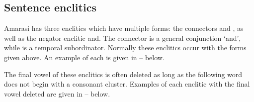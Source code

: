 \subsection{Sentence enclitics}\label{sec:SenEnc}
Amarasi has three enclitics which have multiple forms:
the connectors  and , as well as the negator enclitic  and.
The connector  is a general conjunction `and',
while  is a temporal subordinator.
Normally these enclitics occur with the forms given above.
An example of each is given in
-- below.

\begin{exe}
	\label{ex:130920-1, 0.51 ch:ph}
	\label{ex:130920-1, 2.18 ch:ph}
		\label{ex:130825-6, 17.02 ch:DetPhoPho}
\end{exe}

The final vowel of these enclitics is often deleted
as long as the following word does not begin with a consonant cluster.
Examples of each enclitic with the final vowel deleted
are given in -- below.

